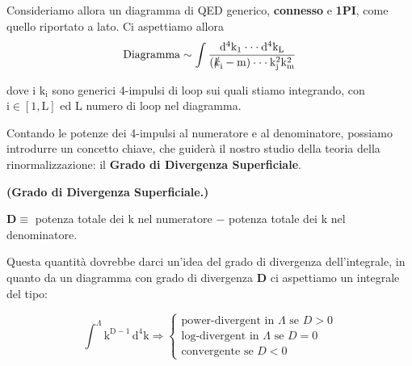 \documentclass[../main.tex]{subfiles}
\begin{document}
Consideriamo allora un diagramma di QED generico, \textbf{connesso} e \textbf{1PI}, come quello riportato a lato. 
Ci aspettiamo allora
\[
    \text{Diagramma} \sim \int\mathrm{\frac{d^4k_1 \cdot\cdot\cdot d^4k_L}{(\slashed k_i-m)\cdot\cdot\cdot k_j^2k_m^2}}
\]

dove i $\mathrm{k_i}$ sono generici 4-impulsi di loop sui quali stiamo integrando, con $\mathrm{i\in [1,L]}$ ed L numero di loop nel diagramma.

Contando le potenze dei 4-impulsi al numeratore e al denominatore, possiamo introdurre un concetto chiave, che guiderà il nostro studio della teoria della rinormalizzazione: il \textbf{Grado di Divergenza Superficiale}.
\begin{definition}
    \textbf{(Grado di Divergenza Superficiale.)}
    \begin{center}
    $\mathbf{D}\equiv$ potenza totale dei $\mathrm{k}$ nel numeratore $-$ potenza totale dei $\mathrm{k}$ nel denominatore.
    \end{center}
    \label{def:DoD_concept}
\end{definition}
Questa quantità dovrebbe darci un'idea del grado di divergenza dell'integrale, in quanto da un diagramma con grado di divergenza $\mathbf{D}$ ci aspettiamo un integrale del tipo:

    \[\int^\Lambda\mathrm{k^{D-1}\,d^4k} \Rightarrow \begin{cases}
    \text{power-divergent in $\Lambda$ se } D>0\\
    \text{log-divergent in $\Lambda$ se } D=0\\
    \text{convergente se } D<0
    \end{cases}\]
\end{document}
